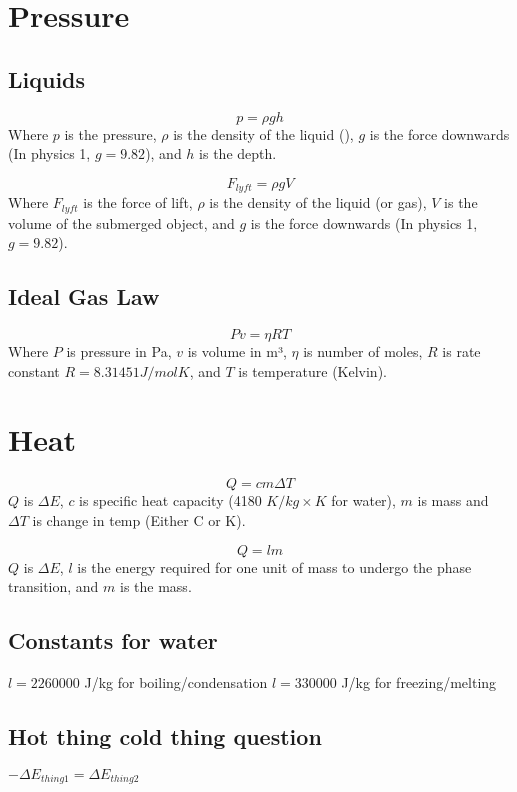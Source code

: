 \documentclass[12pt]{article}
\begin{document}
\section*{Pressure}
	\subsection*{Liquids}
		\begin{multicols}{2}
			\[p = \rho gh\] \break \break
			Where $p$ is the pressure, $\rho$ is the density of the liquid (), $g$ is the force downwards (In physics 1, $g = 9.82$), and $h$ is the depth.
		\end{multicols}
		\begin{multicols}{2}
			\[F_{lyft} = \rho gV\] \break \break
			Where $F_{lyft}$ is the force of lift, $\rho$ is the density of the liquid (or gas), $V$ is the volume of the submerged object, and $g$ is the force downwards (In physics 1, $g = 9.82$).
		\end{multicols}
	\subsection*{Ideal Gas Law}
		\begin{multicols}{2}
			\[ Pv = \eta RT \] \break
			Where $P$ is pressure in Pa, $v$ is volume in m³, $\eta$ is number of moles, $R$ is rate constant $R = 8.31451 J / mol K$, and $T$ is temperature (Kelvin).
		\end{multicols}
\section*{Heat}
	\begin{multicols}{2}
		\[ Q = cm \Delta T \] \break
		$Q$ is $\Delta E$, $c$ is specific heat capacity (4180 $K/kg \times K$ for water), $m$ is mass and $\Delta T$ is change in temp (Either C or K).
	\end{multicols}
	\begin{multicols}{2}
		\[ Q = l m \] \break
		$Q$ is $\Delta E$, $l$ is the energy required for one unit of mass to undergo the phase transition, and $m$ is the mass.
	\end{multicols}
	\begin{multicols}{2}
	\subsection*{Constants for water}
		$l = 2260000$ J/kg for boiling/condensation \newline
		$l = 330000$ J/kg for freezing/melting \newline
	\subsection*{Hot thing cold thing question}
		$-\Delta E_{thing 1} = \Delta E_{thing 2}$
	\end{multicols}
\end{document}
